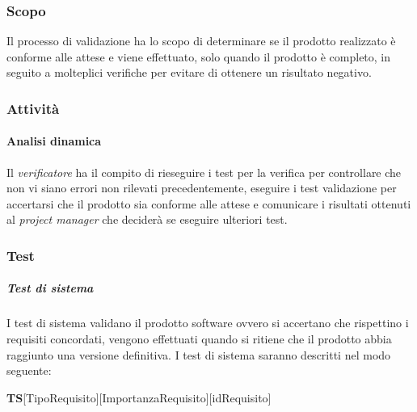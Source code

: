 \subsubsection{Scopo}
Il processo di validazione ha lo scopo di determinare se il prodotto realizzato è conforme alle attese e viene effettuato, solo quando il prodotto è completo, in seguito a molteplici verifiche per evitare di ottenere un risultato negativo.
\subsubsection{Attività}
\paragraph{Analisi dinamica} \Spazio
Il \textit{verificatore} ha il compito di rieseguire i test per la verifica per controllare che non vi siano errori non rilevati precedentemente, eseguire i test validazione per accertarsi che il prodotto sia conforme alle attese e comunicare i risultati ottenuti al \textit{project manager} che deciderà se eseguire ulteriori test.
\subsubsection{Test}
\subparagraph{Test di sistema} \Spazio
I test di sistema validano il prodotto software ovvero si accertano che rispettino i requisiti concordati, vengono effettuati quando si ritiene che il prodotto abbia raggiunto una versione definitiva.\newline
I test di sistema saranno descritti nel modo seguente: \Spazio
\centerline{\textbf{TS}[TipoRequisito][ImportanzaRequisito][idRequisito]}

